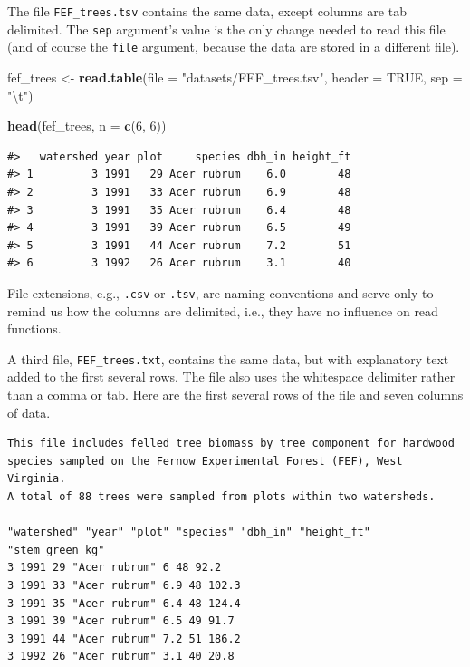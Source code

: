 \documentclass[
  11pt,
]{krantz}
\newenvironment{Shaded}{\begin{snugshade}}{\end{snugshade}}
\newcommand{\CharTok}[1]{\textcolor[rgb]{0.31,0.60,0.02}{#1}}
\newcommand{\DataTypeTok}[1]{\textcolor[rgb]{0.13,0.29,0.53}{#1}}
\newcommand{\DecValTok}[1]{\textcolor[rgb]{0.00,0.00,0.81}{#1}}
\newcommand{\KeywordTok}[1]{\textcolor[rgb]{0.13,0.29,0.53}{\textbf{#1}}}
\newcommand{\NormalTok}[1]{#1}
\newcommand{\OtherTok}[1]{\textcolor[rgb]{0.56,0.35,0.01}{#1}}
\newcommand{\StringTok}[1]{\textcolor[rgb]{0.31,0.60,0.02}{#1}}
\theoremstyle{definition}
\theoremstyle{definition}
\theoremstyle{definition}
\theoremstyle{definition}
\theoremstyle{remark}
\begin{document}
The file \texttt{FEF\_trees.tsv} contains the same data, except columns are tab delimited. The \texttt{sep} argument's value is the only change needed to read this file (and of course the \texttt{file} argument, because the data are stored in a different file).

\begin{Shaded}
\begin{Highlighting}[]
\NormalTok{fef\_trees \textless{}{-}}\StringTok{ }\KeywordTok{read.table}\NormalTok{(}\DataTypeTok{file =} \StringTok{"datasets/FEF\_trees.tsv"}\NormalTok{,}
                        \DataTypeTok{header =} \OtherTok{TRUE}\NormalTok{, }\DataTypeTok{sep =} \StringTok{"}\CharTok{\textbackslash{}t}\StringTok{"}\NormalTok{)}

\KeywordTok{head}\NormalTok{(fef\_trees, }\DataTypeTok{n =} \KeywordTok{c}\NormalTok{(}\DecValTok{6}\NormalTok{, }\DecValTok{6}\NormalTok{)) }
\end{Highlighting}
\end{Shaded}

\begin{verbatim}
#>   watershed year plot     species dbh_in height_ft
#> 1         3 1991   29 Acer rubrum    6.0        48
#> 2         3 1991   33 Acer rubrum    6.9        48
#> 3         3 1991   35 Acer rubrum    6.4        48
#> 4         3 1991   39 Acer rubrum    6.5        49
#> 5         3 1991   44 Acer rubrum    7.2        51
#> 6         3 1992   26 Acer rubrum    3.1        40
\end{verbatim}

File extensions, e.g., \texttt{.csv} or \texttt{.tsv}, are naming conventions and serve only to remind us how the columns are delimited, i.e., they have no influence on read functions.

A third file, \texttt{FEF\_trees.txt}, contains the same data, but with explanatory text added to the first several rows. The file also uses the whitespace delimiter rather than a comma or tab. Here are the first several rows of the file and seven columns of data.

\begin{verbatim}
This file includes felled tree biomass by tree component for hardwood
species sampled on the Fernow Experimental Forest (FEF), West Virginia.
A total of 88 trees were sampled from plots within two watersheds.

"watershed" "year" "plot" "species" "dbh_in" "height_ft" "stem_green_kg"
3 1991 29 "Acer rubrum" 6 48 92.2
3 1991 33 "Acer rubrum" 6.9 48 102.3
3 1991 35 "Acer rubrum" 6.4 48 124.4
3 1991 39 "Acer rubrum" 6.5 49 91.7
3 1991 44 "Acer rubrum" 7.2 51 186.2
3 1992 26 "Acer rubrum" 3.1 40 20.8
\end{verbatim}
\end{document}
